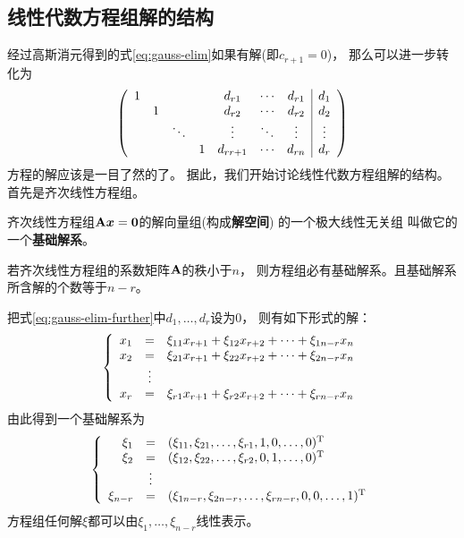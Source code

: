 \subsection{线性代数方程组解的结构}
经过高斯消元得到的式\eqref{eq:gauss-elim}如果有解(即$c_{r+1}=0$)，
那么可以进一步转化为
\begin{equation} \label{eq:gauss-elim-further}
  \mmat{ccccccc|c}{
    1 &        &        &   & d_{r1}   & \cdots & d_{r1} & d_1    \\
      & 1      &        &   & d_{r2}   & \cdots & d_{r2} & d_2    \\
      &        & \ddots &   & \vdots   & \ddots & \vdots & \vdots \\
      &        &        & 1 & d_{rr+1} & \cdots & d_{rn} & d_r
  }
\end{equation}
方程的解应该是一目了然的了。
据此，我们开始讨论线性代数方程组解的结构。
首先是齐次线性方程组。

\begin{definition}[基础解系]
  齐次线性方程组$\mmA\mvx=\mvZero$的解向量组(构成\textbf{解空间})
  的一个极大线性无关组
  叫做它的一个\textbf{基础解系}。
\end{definition}

\begin{theorem}
  若齐次线性方程组的系数矩阵$\mmA$的秩小于$n$，
  则方程组必有基础解系。且基础解系所含解的个数等于$n-r$。
\end{theorem}

\begin{remark}
  把式\eqref{eq:gauss-elim-further}中$d_1,\dots,d_r$设为0，
  则有如下形式的解：
  \begin{displaymath}
  \meqs{rcl}{
    x_1 &=& \xi_{11}x_{r+1}+\xi_{12}x_{r+2}+\cdots+\xi_{1n-r}x_{n} \\
    x_2 &=& \xi_{21}x_{r+1}+\xi_{22}x_{r+2}+\cdots+\xi_{2n-r}x_{n} \\
    & \vdots & \\
    x_r &=& \xi_{r1}x_{r+1}+\xi_{r2}x_{r+2}+\cdots+\xi_{rn-r}x_{n} \\
  }
  \end{displaymath}
  由此得到一个基础解系为
  \begin{displaymath}
  \meqs{rcl} {
    \xi_1 &=& (\xi_{11}, \xi_{21}, \dots, \xi_{r1}, 1, 0, \dots, 0)^\mT \\
    \xi_2 &=& (\xi_{12}, \xi_{22}, \dots, \xi_{r2}, 0, 1, \dots, 0)^\mT \\
    & \vdots & \\
    \xi_{n-r} &=& (\xi_{1n-r}, \xi_{2n-r}, \dots, \xi_{rn-r}, 0, 0, \dots, 1)^\mT
  }
  \end{displaymath}
  方程组任何解$\xi$都可以由$\xi_1,\dots,\xi_{n-r}$线性表示。
\end{remark}


